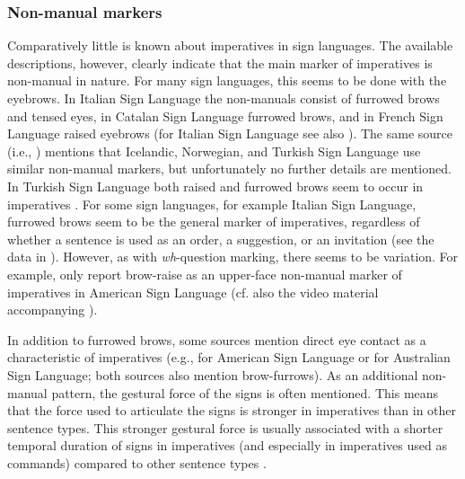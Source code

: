 \subsubsection{Non-manual markers}
Comparatively little is known about imperatives in sign languages. The available descriptions, however, clearly indicate that the main marker of imperatives is non-manual in nature. For many sign languages, this seems to be done with the eyebrows. In Italian Sign Language the non-manuals consist of furrowed brows and tensed eyes, in Catalan Sign Language furrowed brows, and in French Sign Language raised eyebrows \citep{donati2017searching} (for Italian Sign Language see also \citealt{brunelli2011antisymmetry}). The same source (i.e., \citealt{donati2017searching}) mentions that Icelandic, Norwegian, and Turkish Sign Language use similar non-manual markers, but unfortunately no further details are mentioned. In Turkish Sign Language both raised and furrowed brows seem to occur in imperatives \citep{ozsoy2014commands}. For some sign languages, for example Italian Sign Language, furrowed brows seem to be the general marker of imperatives, regardless of whether a sentence is used as an order, a suggestion, or an invitation (see the data in \citealt[306--307]{signgram2017}). However, as with \textit{wh}-question marking, there seems to be variation. For example, \citet{brentari2018production} only report brow-raise as an upper-face non-manual marker of imperatives in American Sign Language (cf. also the video material accompanying \citealt{brentari2018production}).

In addition to furrowed brows, some sources mention direct eye contact as a characteristic of imperatives (e.g., \citealt[143]{valli2000linguistics} for American Sign Language or \citealt[201]{johnston2007australian} for Australian Sign Language; both sources also mention brow-furrows). As an additional non-manual pattern, the gestural force of the signs is often mentioned. This means that the force used to articulate the signs is stronger in imperatives than in other sentence types. This stronger gestural force is usually associated with a shorter temporal duration of signs in imperatives (and especially in imperatives used as commands) compared to other sentence types \citep{brentari2018production}.

